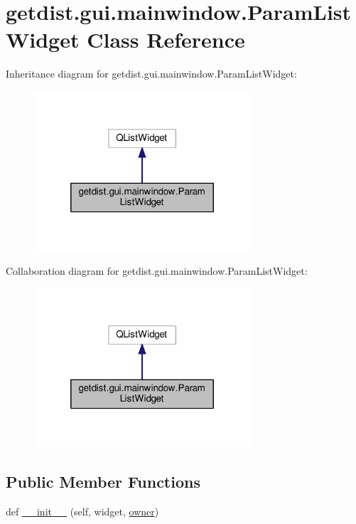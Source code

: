 \hypertarget{classgetdist_1_1gui_1_1mainwindow_1_1ParamListWidget}{}\section{getdist.\+gui.\+mainwindow.\+Param\+List\+Widget Class Reference}
\label{classgetdist_1_1gui_1_1mainwindow_1_1ParamListWidget}


Inheritance diagram for getdist.\+gui.\+mainwindow.\+Param\+List\+Widget\+:
\nopagebreak
\begin{figure}[H]
\begin{center}
\leavevmode
\includegraphics[width=228pt]{classgetdist_1_1gui_1_1mainwindow_1_1ParamListWidget__inherit__graph}
\end{center}
\end{figure}


Collaboration diagram for getdist.\+gui.\+mainwindow.\+Param\+List\+Widget\+:
\nopagebreak
\begin{figure}[H]
\begin{center}
\leavevmode
\includegraphics[width=228pt]{classgetdist_1_1gui_1_1mainwindow_1_1ParamListWidget__coll__graph}
\end{center}
\end{figure}
\subsection*{Public Member Functions}
\begin{DoxyCompactItemize}
\item 
def \mbox{\hyperlink{classgetdist_1_1gui_1_1mainwindow_1_1ParamListWidget_a44826aefdb5d16cdf3e39b49eaf24a98}{\+\_\+\+\_\+init\+\_\+\+\_\+}} (self, widget, \mbox{\hyperlink{classgetdist_1_1gui_1_1mainwindow_1_1ParamListWidget_ae0c05c126fa7e573f3f190770689b115}{owner}})
\end{DoxyCompactItemize}
